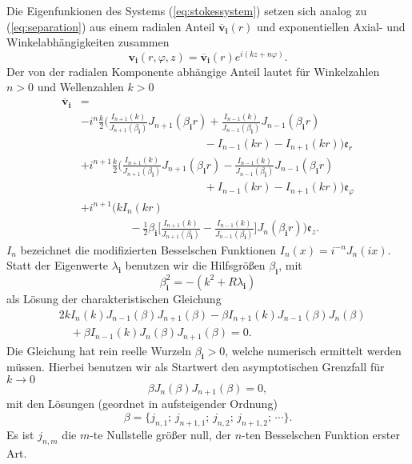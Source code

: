 \documentclass[10pt,a5paper,oneside,draft]{book}
\numberwithin{equation}{chapter}
\begin{document}
Die Eigenfunkionen des Systems (\mbox{\ref{eq:stokessystem}}) setzen sich analog zu (\mbox{\ref{eq:separation}}) aus einem radialen Anteil $\mathbf{\overline{v}_i}(r)$ und exponentiellen Axial- und Winkelabh\"angigkeiten zusammen
\begin{equation}
	\mathbf{v_i}(r,\varphi,z) = \mathbf{\overline{v}_i}(r) e^{i(kz+n\varphi)}.
\end{equation}
Der von der radialen Komponente abh\"angige Anteil lautet f\"ur Winkelzahlen $n>0$ und Wellenzahlen $k>0$
\begin{equation}\label{eq:ansatzfunktionen}
	\begin{split}
	\mathbf{\overline{v}}_\mathbf{i} & =\\
	& -i^n \frac{k}{2} \bigg( \frac{I_{n+1}(k)}{J_{n+1}(\beta_\mathbf{i})} J_{n+1}(\beta_\mathbf{i} r) + \frac{I_{n-1}(k)}{J_{n-1}(\beta_\mathbf{i})} J_{n-1}(\beta_\mathbf{i} r) \\
	&\qquad\qquad\qquad\qquad\qquad\quad - I_{n-1}(kr) - I_{n+1}(kr) \bigg) \mathfrak{e}_r\\
	&+i^{n+1} \frac{k}{2}\bigg( \frac{I_{n+1}(k)}{J_{n+1}(\beta_\mathbf{i})} J_{n+1}(\beta_\mathbf{i} r) - \frac{I_{n-1}(k)}{J_{n-1}(\beta_\mathbf{i})} J_{n-1}(\beta_\mathbf{i} r)\\
	&\qquad\qquad\qquad\qquad\qquad\quad +I_{n-1}(kr) - I_{n+1}(kr) \bigg) \mathfrak{e}_\varphi\\
	&+i^{n+1} \bigg(k I_n(kr) \\
	&\qquad\qquad\,\, -\frac{1}{2}\beta_\mathbf{i} \bigg[ \frac{I_{n+1}(k)}{J_{n+1}(\beta_\mathbf{i})} - \frac{I_{n-1}(k)}{J_{n-1}(\beta_\mathbf{i})} \bigg] J_n(\beta_\mathbf{i} r) \bigg) \mathfrak{e}_z.
	\end{split}
\end{equation}
$I_n$ bezeichnet die modifizierten Besselschen Funktionen $I_n(x)=i^{-n}J_n(ix)$.
Statt der Eigenwerte $\lambda_\mathbf{i}$ benutzen wir die Hilfsgr\"o\ss en $\beta_{\mathbf{i}}$, mit
\begin{equation}
	\beta_\mathbf{i}^2 = -(k^2+R\lambda_\mathbf{i})
\end{equation}
als L\"osung der charakteristischen Gleichung 
\begin{equation}
	\begin{split}
	&2k I_n(k) J_{n-1}(\beta) J_{n+1}(\beta) - \beta I_{n+1} (k) J_{n-1} (\beta) J_n(\beta)\\
	&\quad+ \beta I_{n-1} (k) J_{n} (\beta) J_{n+1}(\beta) = 0.
	\end{split}
\end{equation}
Die Gleichung hat rein reelle Wurzeln $\beta_\mathbf{i}>0$, welche numerisch ermittelt werden m\"ussen. 
Hierbei benutzen wir als Startwert den asymptotischen Grenzfall f\"ur $k\to 0$
\begin{equation}
	\beta J_n(\beta) J_{n+1}(\beta) = 0,
\end{equation}
mit den L\"osungen (geordnet in aufsteigender Ordnung)
\begin{equation}
	\beta = \{ j_{n,1};\, j_{n+1,1};\, j_{n,2};\, j_{n+1,2};\, \cdots \}.
\end{equation}
Es ist $j_{n,m}$ die $m$-te Nullstelle gr\"o\ss er null, der $n$-ten Besselschen Funktion erster Art.\\
\end{document}
